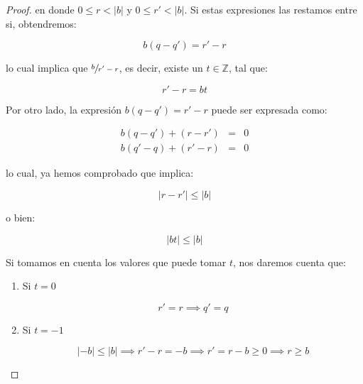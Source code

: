 \begin{proof}
            en donde $0 \leq r < |b|$ y $0 \leq r' < |b|$.
            Si estas expresiones las restamos entre si, obtendremos:

            \begin{equation*}
                b(q - q') = r' - r
            \end{equation*}

            lo cual implica que $\sfrac{b}{r' - r}$, es decir, existe un $t \in \mathbb{Z}$, tal que:

            \begin{equation*}
                r' - r = bt
            \end{equation*}

            Por otro lado, la expresión $b(q - q') = r' - r$ puede ser expresada como:

            \begin{eqnarray*}
                b(q - q') + (r - r') & = & 0 \\
                b(q' - q) + (r' - r) & = & 0
            \end{eqnarray*}

            lo cual, ya hemos comprobado que implica:

            \begin{equation*}
                |r - r'| \leq |b|
            \end{equation*}

            o bien:

            \begin{equation*}
                |bt| \leq |b|
            \end{equation*}

            Si tomamos en cuenta los valores que puede tomar $t$, nos daremos cuenta que:

            \begin{enumerate}
                \item Si $t = 0$

                \begin{equation*}
                    r' = r \implies q' = q
                \end{equation*}

                \item Si $t = -1$

                \begin{equation*}
                    |-b| \leq |b| \implies r' - r = -b \implies r' = r - b \geq 0 \implies r \geq b
                \end{equation*}


\end{enumerate}
\end{proof}
